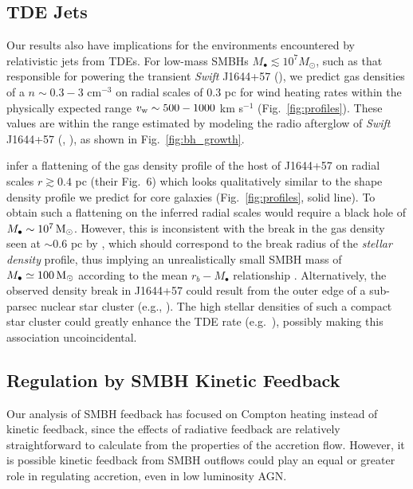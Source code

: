 \documentclass[usenatbib,fleqn]{mn2e}
\newcommand{\Mbh}[1][]{M_{\bullet#1}}
\begin{document}
\subsection{TDE Jets}
\label{sec:TDE}

Our results also have implications for the environments encountered by
relativistic jets from TDEs.  For low-mass SMBHs $M_{\bullet} \lesssim
10^{7}M_{\odot}$, such as that responsible for powering the transient {\it Swift}
J1644+57 (\citealt{Bloom+11}), we predict gas densities of a $n
\sim 0.3-3$ cm$^{-3}$ on radial scales of 0.3 pc for wind heating
rates within the physically expected range $v_{\rm w} \sim 500-1000$
km s$^{-1}$ (Fig.~\ref{fig:profiles}).  These values are within the
range estimated by modeling the radio afterglow of {\it Swift}
J1644+57 (\citealt{Metzger+12}, \citealt{BergerZauderer+:2012a}), as shown in Fig.~\ref{fig:bh_growth}.

\citet{BergerZauderer+:2012a} infer a flattening of the gas density
profile of the host of J1644+57 on radial scales $r \gtrsim 0.4$ pc (their Fig.~6) which looks
qualitatively similar to the shape density profile we predict for core
galaxies (Fig.~\ref{fig:profiles}, solid line).  To obtain such a flattening on the inferred radial scales would require a black hole of $\Mbh\sim 10^7 \Msun$.  However,  this is inconsistent with the break in the gas density seen at $\sim 0.6$ pc by \citet{BergerZauderer+:2012a}, which should correspond to the break radius of the {\it stellar density} profile, thus implying an unrealistically small SMBH mass of $\Mbh\simeq 100\Msun$ according to the mean $r_b-M_{\bullet}$ relationship \citep{LauerFaber+:2007a}.  Alternatively, the observed density break in J1644+57 could result from the outer edge of a sub-parsec nuclear star cluster (e.g., \citealt{Carson+15}).  The high stellar densities of such a compact star cluster could greatly enhance the TDE rate (e.g.~\citealt{Stone&Metzger15}), possibly making this association uncoincidental.


\subsection{Regulation by SMBH Kinetic Feedback}
\label{sec:kinetic}

Our analysis of SMBH feedback has focused on Compton heating
instead of kinetic feedback, since the effects of radiative feedback
are relatively straightforward to calculate from the properties of the
accretion flow.  However, it is possible kinetic feedback from SMBH outflows could play an equal or greater role in regulating accretion, even in low luminosity AGN.
\end{document}
